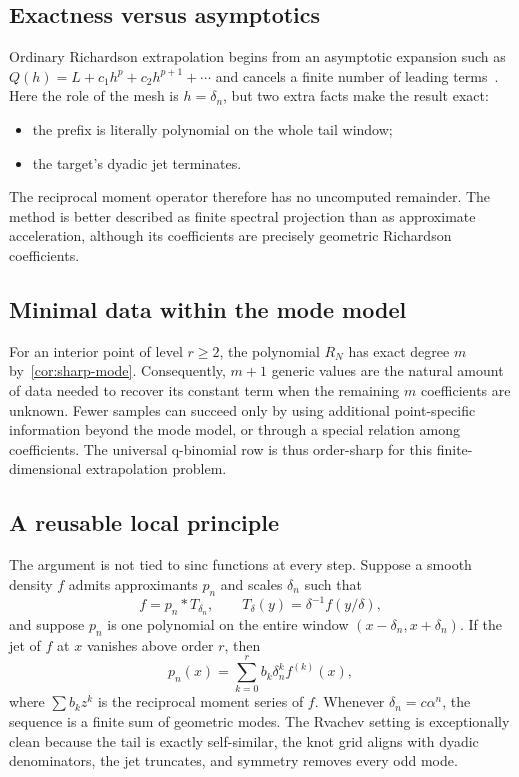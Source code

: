 \documentclass[11pt,a4paper]{article}
\theoremstyle{remark}
\begin{document}
\subsection{Exactness versus asymptotics}

Ordinary Richardson extrapolation begins from an asymptotic expansion such as
$Q(h)=L+c_1h^p+c_2h^{p+1}+\cdots$ and cancels a finite number of leading
terms~\cite{Richardson1911,Brezinski1991}.  Here the role of the mesh is
$h=\delta_n$, but two extra facts make the result exact:

\begin{itemize}
\item the prefix is literally polynomial on the whole tail window;
\item the target's dyadic jet terminates.
\end{itemize}

The reciprocal moment operator therefore has no uncomputed remainder.  The
method is better described as finite spectral projection than as approximate
acceleration, although its coefficients are precisely geometric Richardson
coefficients.

\subsection{Minimal data within the mode model}

For an interior point of level $r\ge2$, the polynomial $R_N$ has exact degree
$m$ by~\cref{cor:sharp-mode}.  Consequently, $m+1$ generic values are the
natural amount of data needed to recover its constant term when the remaining
$m$ coefficients are unknown.  Fewer samples can succeed only by using
additional point-specific information beyond the mode model, or through a
special relation among coefficients.  The universal q-binomial row is thus
order-sharp for this finite-dimensional extrapolation problem.

\subsection{A reusable local principle}

The argument is not tied to sinc functions at every step.  Suppose a smooth
density $f$ admits approximants $p_n$ and scales $\delta_n$ such that
\[
 f=p_n*T_{\delta_n},
 \qquad T_\delta(y)=\delta^{-1}f(y/\delta),
\]
and suppose $p_n$ is one polynomial on the entire window
$(x-\delta_n,x+\delta_n)$.  If the jet of $f$ at $x$ vanishes above order $r$,
then
\[
 p_n(x)=\sum_{k=0}^{r}b_k\delta_n^kf^{(k)}(x),
\]
where $\sum b_kz^k$ is the reciprocal moment series of $f$.  Whenever
$\delta_n=c\alpha^n$, the sequence is a finite sum of geometric modes.  The
Rvachev setting is exceptionally clean because the tail is exactly
self-similar, the knot grid aligns with dyadic denominators, the jet truncates,
and symmetry removes every odd mode.
\end{document}
